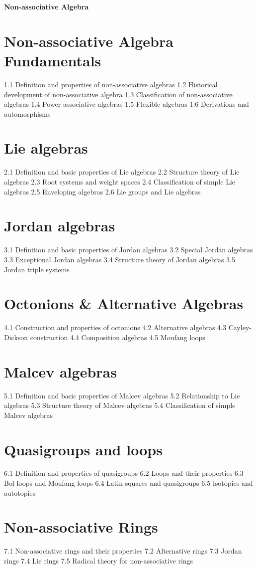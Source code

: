 {\LARGE \bf{Non-associative Algebra}}
\section{Non-associative Algebra Fundamentals}
1.1 Definition and properties of non-associative algebras
1.2 Historical development of non-associative algebra
1.3 Classification of non-associative algebras
1.4 Power-associative algebras
1.5 Flexible algebras
1.6 Derivations and automorphisms
\section{Lie algebras}
2.1 Definition and basic properties of Lie algebras
2.2 Structure theory of Lie algebras
2.3 Root systems and weight spaces
2.4 Classification of simple Lie algebras
2.5 Enveloping algebras
2.6 Lie groups and Lie algebras
\section{Jordan algebras}
3.1 Definition and basic properties of Jordan algebras
3.2 Special Jordan algebras
3.3 Exceptional Jordan algebras
3.4 Structure theory of Jordan algebras
3.5 Jordan triple systems
\section{Octonions \& Alternative Algebras}
4.1 Construction and properties of octonions
4.2 Alternative algebras
4.3 Cayley-Dickson construction
4.4 Composition algebras
4.5 Moufang loops
\section{Malcev algebras}
5.1 Definition and basic properties of Malcev algebras
5.2 Relationship to Lie algebras
5.3 Structure theory of Malcev algebras
5.4 Classification of simple Malcev algebras
\section{Quasigroups and loops}
6.1 Definition and properties of quasigroups
6.2 Loops and their properties
6.3 Bol loops and Moufang loops
6.4 Latin squares and quasigroups
6.5 Isotopies and autotopies
\section{Non-associative Rings}
7.1 Non-associative rings and their properties
7.2 Alternative rings
7.3 Jordan rings
7.4 Lie rings
7.5 Radical theory for non-associative rings
